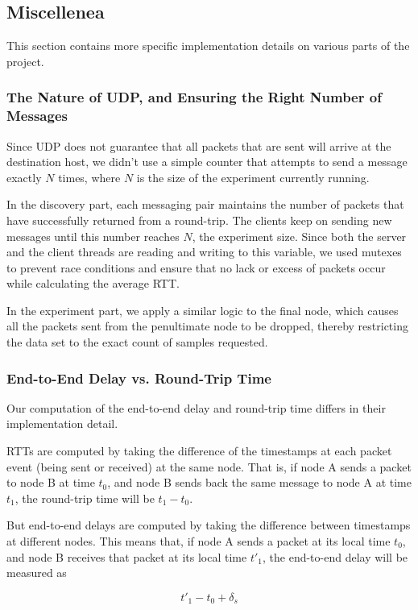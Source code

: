\documentclass[conference]{IEEEtran}
\begin{document}
\subsection{Miscellenea}
This section contains more specific implementation details on various parts of the project.

\subsubsection{The Nature of UDP, and Ensuring the Right Number of Messages}
Since UDP does not guarantee that all packets that are sent will arrive at the destination host,
we didn't use a simple counter that attempts to send a message exactly $N$ times, where $N$ is the
size of the experiment currently running.

In the discovery part, each messaging pair maintains the number of packets that have successfully
returned from a round-trip. The clients keep on sending new messages until this number reaches $N$,
the experiment size. Since both the server and the client threads are reading and writing to this
variable, we used mutexes to prevent race conditions and ensure that no lack or excess of packets
occur while calculating the average RTT.

In the experiment part, we apply a similar logic to the final node, which causes all the packets
sent from the penultimate node to be dropped, thereby restricting the data set to the exact count
of samples requested.

\subsubsection{End-to-End Delay vs. Round-Trip Time}
Our computation of the end-to-end delay and round-trip time differs in their implementation detail.

RTTs are computed by taking the difference of the timestamps at each packet event (being sent or
received) at the same node. That is, if node A sends a packet to node B at time $t_0$, and node
B sends back the same message to node A at time $t_1$, the round-trip time will be $t_1 - t_0$.

But end-to-end delays are computed by taking the difference between timestamps at different nodes.
This means that, if node A sends a packet at its local time $t_0$, and node B receives that packet
at its local time $t'_1$, the end-to-end delay will be measured as

$$
t'_1 - t_0 + \delta_{s}
$$
\end{document}
